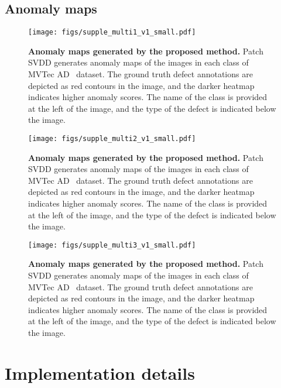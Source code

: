 \documentclass[runningheads]{llncs}
\begin{document}
\subsection{Anomaly maps}
\begin{figure}[H]
    \centering
    \texttt{[image: figs/supple\_multi1\_v1\_small.pdf]}
    \vspace{-2em}
    \caption{\textbf{Anomaly maps generated by the proposed method.} Patch SVDD generates anomaly maps of the images in each class of MVTec AD~\cite{mvtecad} dataset. The ground truth defect annotations are depicted as red contours in the image, and the darker heatmap indicates higher anomaly scores. The name of the class is provided at the left of the image, and the type of the defect is indicated below the image.
    }
    \label{fig:anomaly_maps1}
\end{figure}
 \clearpage
\begin{figure}[]
    \centering
    \texttt{[image: figs/supple\_multi2\_v1\_small.pdf]}
    \vspace{-2em}
    \caption{\textbf{Anomaly maps generated by the proposed method.} Patch SVDD generates anomaly maps of the images in each class of MVTec AD~\cite{mvtecad} dataset. The ground truth defect annotations are depicted as red contours in the image, and the darker heatmap indicates higher anomaly scores. The name of the class is provided at the left of the image, and the type of the defect is indicated below the image.
    }
    \label{fig:anomaly_maps2}
\end{figure}
 \clearpage
\begin{figure}[]
    \centering
    \texttt{[image: figs/supple\_multi3\_v1\_small.pdf]}
    \vspace{-2em}
    \caption{\textbf{Anomaly maps generated by the proposed method.} Patch SVDD generates anomaly maps of the images in each class of MVTec AD~\cite{mvtecad} dataset. The ground truth defect annotations are depicted as red contours in the image, and the darker heatmap indicates higher anomaly scores. The name of the class is provided at the left of the image, and the type of the defect is indicated below the image.
    }
    \label{fig:anomaly_maps3}
\end{figure}
 \clearpage

\section{Implementation details} \label{sec:appendix_implementation}
\end{document}
